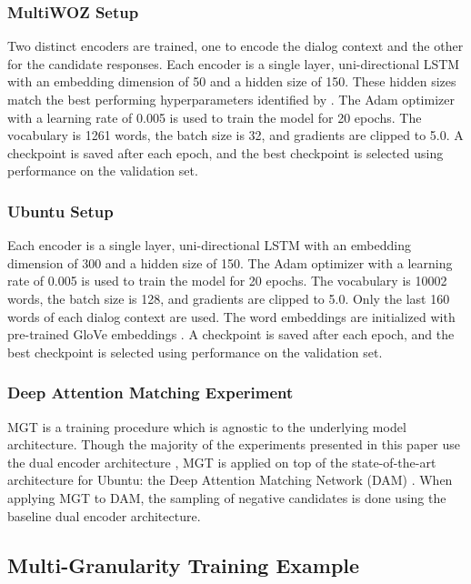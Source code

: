 \documentclass[11pt,a4paper]{article}
\begin{document}
\subsubsection{MultiWOZ Setup}

Two distinct encoders are trained, one to encode the dialog context and the other for the candidate responses. Each encoder is a single layer, uni-directional LSTM with an embedding dimension of 50 and a hidden size of 150. These hidden sizes match the best performing hyperparameters identified by \citet{budzianowski2018multiwoz}. The Adam optimizer \citep{kingma2014adam} with a learning rate of 0.005 is used to train the model for 20 epochs. The vocabulary is 1261 words, the batch size is 32, and gradients are clipped to 5.0. A checkpoint is saved after each epoch, and the best checkpoint is selected using performance on the validation set.

\subsubsection{Ubuntu Setup}

Each encoder is a single layer, uni-directional LSTM with an embedding dimension of 300 and a hidden size of 150. The Adam optimizer \citep{kingma2014adam} with a learning rate of 0.005 is used to train the model for 20 epochs. The vocabulary is 10002 words, the batch size is 128, and gradients are clipped to 5.0. Only the last 160 words of each dialog context are used. The word embeddings are initialized with pre-trained GloVe embeddings \citep{pennington2014glove}. A checkpoint is saved after each epoch, and the best checkpoint is selected using performance on the validation set.

\subsubsection{Deep Attention Matching Experiment}

MGT is a training procedure which is agnostic to the underlying model architecture. Though the majority of the experiments presented in this paper use the dual encoder architecture \citep{lowe2015ubuntu}, MGT is applied on top of the state-of-the-art architecture for Ubuntu: the Deep Attention Matching Network (DAM) \citep{zhou2018multi}. When applying MGT to DAM, the sampling of negative candidates is done using the baseline dual encoder architecture.


\subsection{Multi-Granularity Training Example}
\end{document}

